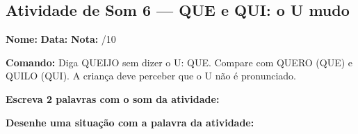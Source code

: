\subsection{Atividade de Som 6 --- QUE e QUI: o U mudo}
\begin{exercicio}



\noindent\textbf{Nome:} \underline{\hspace{3.2cm}} \quad \textbf{Data:} \underline{\hspace{1.6cm}} \quad \textbf{Nota:} \underline{\hspace{0.9cm}}/10


\noindent\textbf{Comando:} Diga QUEIJO sem dizer o U: QUE. Compare com QUERO (QUE) e QUILO (QUI). A criança deve perceber que o U não é pronunciado.


\begin{center}
\end{center}

\noindent\textbf{Escreva 2 palavras com o som da atividade:}

\begin{center}
  \underline{\hspace{3cm}} \quad \underline{\hspace{3cm}}
\end{center}

\noindent\textbf{Desenhe uma situação com a palavra da atividade:}

\begin{center}
\end{center}

\end{exercicio}



